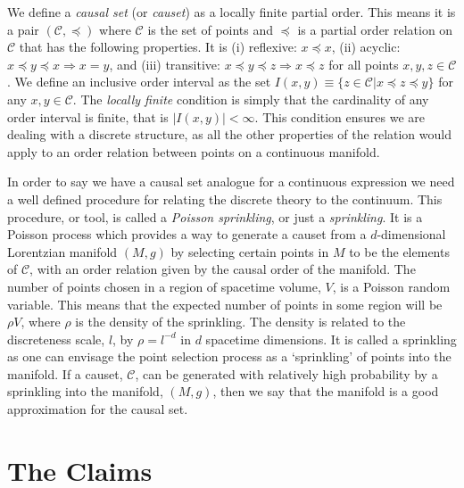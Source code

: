 \documentclass[12pt]{article}
\begin{document}
We define a \textit{causal set} (or \textit{causet}) as a locally finite partial order. This means it is a pair $ (\mathcal{C},\preceq)$ where $\mathcal{C}$ is the set of points and $\preceq$ is a partial order relation on $\mathcal{C}$ that has the following properties. It is (i) reflexive: $x\preceq x$, (ii) acyclic: $x\preceq y\preceq x \Rightarrow x=y$, and (iii) transitive: $x\preceq y\preceq z \Rightarrow x\preceq z$ for all points $x, y, z \in \mathcal{C}$. We define an inclusive order interval as the set $I (x,y)\equiv \lbrace z\in\mathcal{C}|x\preceq z\preceq y\rbrace$ for any $x, y\in\mathcal{C}$. The \textit{locally finite} condition is simply that the cardinality of any order interval is finite, that is $|I (x,y)|<\infty$. This condition ensures we are dealing with a discrete structure, as all the other properties of the relation would apply to an order relation between points on a continuous manifold.

In order to say we have a causal set analogue for a continuous expression we need a well defined procedure for relating the discrete theory to the continuum. This procedure, or tool, is called a \textit{Poisson sprinkling}, or just a \textit{sprinkling}. It is a Poisson process which provides a way to generate a causet from a $d$-dimensional Lorentzian manifold $ (M,g)$ by selecting certain points in $M$ to be the elements of $\mathcal{C}$, with an order relation given by the causal order of the manifold. The number of points chosen in a region of spacetime volume, $V$, is a Poisson random variable. This means that the expected number of points in some region will be $\rho V$, where $\rho$ is the density of the sprinkling. The density is related to the discreteness scale, $l$, by $\rho=l^{-d}$ in $d$ spacetime dimensions. It is called a sprinkling as one can envisage the point selection process as a `sprinkling' of points into the manifold. If a causet, $\mathcal{C}$, can be generated with relatively high probability by a sprinkling into the manifold, $ (M,g)$, then we say that the manifold is a good approximation for the causal set.

\section{The Claims}
\end{document}
